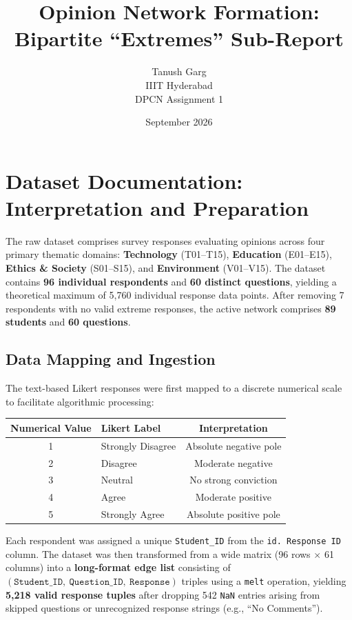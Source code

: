 \documentclass[11pt, a4paper]{article}
\title{\textbf{Opinion Network Formation: \\ Bipartite ``Extremes'' Sub-Report}}
\author{Tanush Garg \\ IIIT Hyderabad \\ DPCN Assignment 1}
\date{September 2026}
\begin{document}
\maketitle
\tableofcontents
\newpage

\section{Dataset Documentation: Interpretation and Preparation}

The raw dataset comprises survey responses evaluating opinions across four primary thematic domains: \textbf{Technology} (T01--T15), \textbf{Education} (E01--E15), \textbf{Ethics \& Society} (S01--S15), and \textbf{Environment} (V01--V15). The dataset contains \textbf{96 individual respondents} and \textbf{60 distinct questions}, yielding a theoretical maximum of 5,760 individual response data points. After removing 7 respondents with no valid extreme responses, the active network comprises \textbf{89 students} and \textbf{60 questions}.

\subsection{Data Mapping and Ingestion}

The text-based Likert responses were first mapped to a discrete numerical scale to facilitate algorithmic processing:

\begin{center}
\begin{tabular}{clc}
\toprule
\textbf{Numerical Value} & \textbf{Likert Label} & \textbf{Interpretation} \\
\midrule
1 & Strongly Disagree & Absolute negative pole \\
2 & Disagree & Moderate negative \\
3 & Neutral & No strong conviction \\
4 & Agree & Moderate positive \\
5 & Strongly Agree & Absolute positive pole \\
\bottomrule
\end{tabular}
\end{center}

Each respondent was assigned a unique \texttt{Student\_ID} from the \texttt{id. Response ID} column. The dataset was then transformed from a wide matrix (96 rows $\times$ 61 columns) into a \textbf{long-format edge list} consisting of $(\texttt{Student\_ID},\ \texttt{Question\_ID},\ \texttt{Response})$ triples using a \texttt{melt} operation, yielding \textbf{5,218 valid response tuples} after dropping 542 \texttt{NaN} entries arising from skipped questions or unrecognized response strings (e.g., ``No Comments'').
\end{document}
